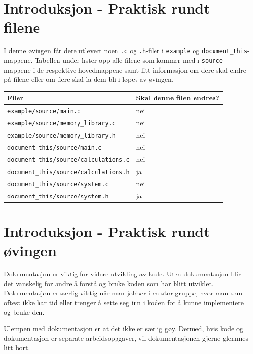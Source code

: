 

\begin{alphasection}

\section{Introduksjon - Praktisk rundt filene}

I denne øvingen får dere utlevert noen \verb|.c| og \verb|.h|-filer i \verb|example| og \verb|document_this|-mappene. Tabellen under lister opp alle filene som kommer med i \verb|source|-mappene i de respektive hovedmappene samt litt informasjon om dere skal endre på filene eller om dere skal la dem bli i løpet av øvingen.

\begin{center}
 \begin{tabular}{|p{8.5cm} p{5.5cm}|} 
 \hline
 \textbf{Filer} & \textbf{Skal denne filen endres?}  \\ [0.5ex] 
 \hline\hline
 \verb|example/source/main.c| & nei  \\ 
 \hline
 \verb|example/source/memory_library.c| & nei  \\ 
 \hline
 \verb|example/source/memory_library.h| & nei  \\ 
 \hline
  \verb|document_this/source/main.c| & nei  \\ 
 \hline
 \verb|document_this/source/calculations.c| & nei  \\ 
 \hline
 \verb|document_this/source/calculations.h| & ja  \\ 
 \hline
 \verb|document_this/source/system.c| & nei  \\ 
 \hline
 \verb|document_this/source/system.h| & ja  \\ 
 \hline
\end{tabular}
\end{center}

\section{Introduksjon - Praktisk rundt øvingen}\label{sec:intro}
Dokumentasjon er viktig for videre utvikling av kode. Uten dokumentasjon blir det vanskelig for andre å forstå og bruke koden som har blitt utviklet. Dokumentasjon er særlig viktig når man jobber i en stor gruppe, hvor man som oftest ikke har tid eller trenger å sette seg inn i koden for å kunne implementere og bruke den.

Ulempen med dokumentasjon er at det ikke er særlig gøy. Dermed, hvis kode
og dokumentasjon er separate arbeidsoppgaver, vil dokumentasjonen gjerne
glemmes litt bort. 


\end{alphasection}
